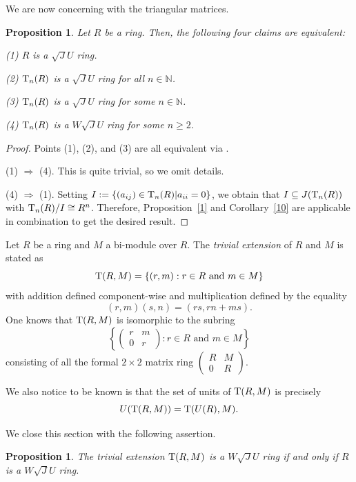 \documentclass[12pt]{amsart}
\newtheorem{proposition}[theorem]{Proposition} \newtheorem{lemma}[theorem]{Lemma}
\begin{document}
We are now concerning with the triangular matrices.

\begin{proposition}\label{uper} Let $R$ be a ring. Then, the following four claims are equivalent:

(1) $R$ is a $\sqrt{J}U$ ring.

(2) ${\rm T}_{n}(R)$ is a $\sqrt{J}U$ ring for all $n \in \mathbb{N}$.

(3) ${\rm T}_n(R)$ is a $\sqrt{J}U$ ring for some $n \in \mathbb{N}$.

(4) ${\rm T}_n(R)$ is a $W\sqrt{J}U$ ring for some $n \geq 2$.
\end{proposition}

\begin{proof} Points (1), (2), and (3) are all equivalent via \cite[Proposition 3.19(3)]{DDE}.

(1) $\Rightarrow$ (4). This is quite trivial, so we omit details.

(4) $\Rightarrow$ (1). Setting $I:=\{ (a_{ij})\in {\rm T}_{n}(R)| a_{ii}=0\}$, we obtain that $I\subseteq J({\rm T}_{n}(R))$ with ${\rm T}_{n}(R)/{I}\cong R^{n}$. Therefore, Proposition~\ref{1} and Corollary~\ref{10} are applicable in combination to get the desired result.
\end{proof}

Let $R$ be a ring and $M$ a bi-module over $R$. The {\it trivial extension} of $R$ and $M$ is stated as \[{\rm T}(R,M) = \{(r, m) : r \in R \text{ and } m \in M\} \] with addition defined component-wise and multiplication
defined by the equality \[ (r, m)(s, n) = (rs, rn + ms). \] One knows that ${\rm T}(R, M)$ is isomorphic to the subring \[ \left\{ \begin{pmatrix} r & m \\ 0 & r \end{pmatrix} : r \in R \text{ and } m \in M \right\} \]
consisting of all the formal $2 \times 2$ matrix ring $\begin{pmatrix} R & M \\ 0 & R \end{pmatrix}$. 

We also notice to be known is that the set of units of ${\rm T}(R, M)$ is precisely \[ U({\rm T}(R, M)) = {\rm T}(U(R), M). \]

We close this section with the following assertion.

\begin{proposition}\label{3.4} The trivial extension ${\rm T}(R, M)$ is a $W\sqrt{J}U$ ring if and only if $R$ is a $W\sqrt{J}U$ ring. 
\end{proposition} 
\end{document}
